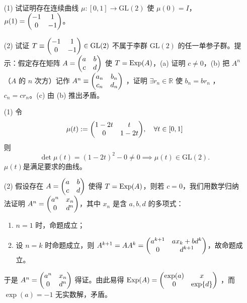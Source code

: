 \begin{xiti}
	\item \begin{enumerate}
		\item[(1)] 试证明存在连续曲线 $\mu \colon [0,1] \rightarrow \mathrm{GL}(2)$ 使 $\mu(0)=I$，$\mu(1)=\mqty(-1 & 1 \\ 0 & -1)$。
		\item[(2)] 试证 $T\equiv \mqty(-1 & 1 \\ 0 & -1) \in \mathrm{GL}(2)$ 不属于李群 $\mathrm{GL}(2)$ 的任一单参子群。提示：假定存在矩阵 $A=\mqty(a&b\\c&d)$ 使 $T=\operatorname{Exp}(A)$，(a) 证明 $c\neq 0$，(b) 把 $A^n$ （$A$ 的 $n$ 次方）记作 $A^n \equiv \mqty(a_n & b_n \\ c_n & d_n)$ ，证明 $\exists r_n\in \mathbb{R}$ 使 $b_n = b r_n$ ， $c_n=c r_n$。(c) 由 (b) 推出矛盾。
	\end{enumerate}

    \begin{zm}
    	\begin{enumerate}
    		\item[(1)] 令
    		\begin{displaymath}
    		\mu(t) := \mqty(1-2t & t \\ 0 & 1-2t)\qc \forall t\in [0,1]
    		\end{displaymath}
    		则
    		\begin{displaymath}
    		\det \mu(t) = \left(1-2t\right)^2 -0 \neq 0 \implies \mu(t) \in \mathrm{GL}(2).
    		\end{displaymath}
    		$\mu(t)$是满足要求的曲线。
			\item[(2)] 假设存在 $A=\mqty(a & b \\ c & d)$ 使得 $T=\operatorname{Exp}(A)$，则若 $c=0$，我们用数学归纳法证明 $A^n=\mqty(a^n & x_n \\ 0 & d^n)$，其中 $x_n$ 是含 $a,b,d$ 的多项式：
			\begin{enumerate}
				\item $n=1$ 时，命题成立；
				\item 设 $n=k$ 时命题成立，则 $A^{k+1}=A A^k= \mqty(a^{k+1} & a x_k + b d^k \\ 0 & d^{k+1})$，故命题成立。
			\end{enumerate}
			于是 $A^n=\mqty(a^n & x_n \\ 0 & d^n)$ 得证。由此易得 $\Exp(A)=\mqty(\exp(a) & x \\ 0 & \exp{d})$ ，而$\exp(a)=-1$ 无实数解，矛盾。
    	\end{enumerate}
    \end{zm}

\end{xiti}
